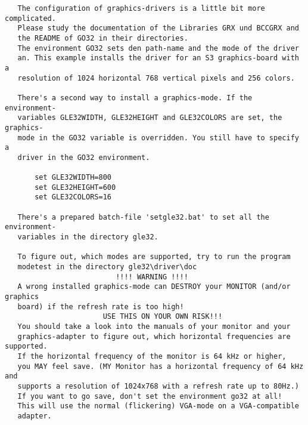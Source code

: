 \begin{center}
\begin{minipage}[t]{11.0cm}
{\begin{verbatim}
   The configuration of graphics-drivers is a little bit more complicated.
   Please study the documentation of the Libraries GRX und BCCGRX and
   the README of GO32 in their directories.
   The environment GO32 sets den path-name and the mode of the driver
   an. This example installs the driver for an S3 graphics-board with a
   resolution of 1024 horizontal 768 vertical pixels and 256 colors.

   There's a second way to install a graphics-mode. If the environment-
   variables GLE32WIDTH, GLE32HEIGHT and GLE32COLORS are set, the graphics-
   mode in the GO32 variable is overridden. You still have to specify a
   driver in the GO32 environment.

       set GLE32WIDTH=800
       set GLE32HEIGHT=600
       set GLE32COLORS=16

   There's a prepared batch-file 'setgle32.bat' to set all the environment-
   variables in the directory gle32.

   To figure out, which modes are supported, try to run the program
   modetest in the directory gle32\driver\doc
                          !!!! WARNING !!!!
   A wrong installed graphics-mode can DESTROY your MONITOR (and/or graphics
   board) if the refresh rate is too high!
                       USE THIS ON YOUR OWN RISK!!!
   You should take a look into the manuals of your monitor and your
   graphics-adapter to figure out, which horizontal frequencies are supported.
   If the horizontal frequency of the monitor is 64 kHz or higher,
   you MAY feel save. (MY Monitor has a horizontal frequency of 64 kHz and
   supports a resolution of 1024x768 with a refresh rate up to 80Hz.)
   If you want to go save, don't set the environment go32 at all!
   This will use the normal (flickering) VGA-mode on a VGA-compatible
   adapter.
\end{verbatim}
}
\end{minipage}
\end{center}
